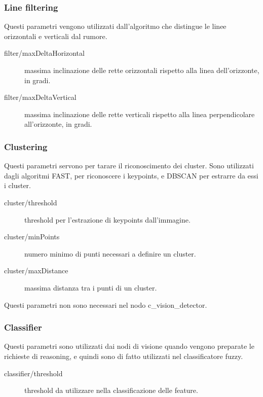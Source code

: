 \subsubsection{Line filtering}

Questi parametri vengono utilizzati dall'algoritmo che distingue le linee orizzontali e verticali dal rumore.

\begin{description}
 \item [filter/maxDeltaHorizontal] massima inclinazione delle rette orizzontali rispetto alla linea dell'orizzonte, in gradi.
 \item [filter/maxDeltaVertical] massima inclinazione delle rette verticali rispetto alla linea perpendicolare all'orizzonte, in gradi.
\end{description}


\subsubsection{Clustering}

Questi parametri servono per tarare il riconoscimento dei cluster. Sono utilizzati dagli algoritmi FAST, per riconoscere i keypoints, e DBSCAN per estrarre da essi i cluster.

\begin{description}
 \item [cluster/threshold] threshold per l'estrazione di keypoints dall'immagine.
 \item [cluster/minPoints] numero minimo di punti necessari a definire un cluster.
 \item [cluster/maxDistance] massima distanza tra i punti di un cluster.
\end{description}

Questi parametri non sono necessari nel nodo c\_vision\_detector.

\subsubsection{Classifier}

Questi parametri sono utilizzati dai nodi di visione quando vengono preparate le richieste di reasoning, e quindi sono di fatto utilizzati nel classificatore fuzzy.

\begin{description}
 \item [classifier/threshold] threshold da utilizzare nella classificazione delle feature.
\end{description}

